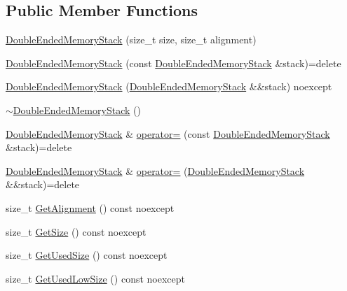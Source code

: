 \subsection*{Public Member Functions}
\begin{DoxyCompactItemize}
\item 
\mbox{\hyperlink{classmage_1_1_double_ended_memory_stack_a6480666c03ac703fc4fd5a62a766438d}{Double\+Ended\+Memory\+Stack}} (size\+\_\+t size, size\+\_\+t alignment)
\item 
\mbox{\hyperlink{classmage_1_1_double_ended_memory_stack_a8a903d4a209929854a6f50cf98e3e2da}{Double\+Ended\+Memory\+Stack}} (const \mbox{\hyperlink{classmage_1_1_double_ended_memory_stack}{Double\+Ended\+Memory\+Stack}} \&stack)=delete
\item 
\mbox{\hyperlink{classmage_1_1_double_ended_memory_stack_a89d83095cc04686b9775fc4a55a5ff30}{Double\+Ended\+Memory\+Stack}} (\mbox{\hyperlink{classmage_1_1_double_ended_memory_stack}{Double\+Ended\+Memory\+Stack}} \&\&stack) noexcept
\item 
\mbox{\hyperlink{classmage_1_1_double_ended_memory_stack_afaac4a28ea1e386bc83d3e07fd5531a0}{$\sim$\+Double\+Ended\+Memory\+Stack}} ()
\item 
\mbox{\hyperlink{classmage_1_1_double_ended_memory_stack}{Double\+Ended\+Memory\+Stack}} \& \mbox{\hyperlink{classmage_1_1_double_ended_memory_stack_aafcc4b3cd8d87d75cc3de53994b6ef7e}{operator=}} (const \mbox{\hyperlink{classmage_1_1_double_ended_memory_stack}{Double\+Ended\+Memory\+Stack}} \&stack)=delete
\item 
\mbox{\hyperlink{classmage_1_1_double_ended_memory_stack}{Double\+Ended\+Memory\+Stack}} \& \mbox{\hyperlink{classmage_1_1_double_ended_memory_stack_a95b220925f1ef732c104901c3f55015d}{operator=}} (\mbox{\hyperlink{classmage_1_1_double_ended_memory_stack}{Double\+Ended\+Memory\+Stack}} \&\&stack)=delete
\item 
size\+\_\+t \mbox{\hyperlink{classmage_1_1_double_ended_memory_stack_a6f2d4036e67cca2836293ad421ddfdfd}{Get\+Alignment}} () const noexcept
\item 
size\+\_\+t \mbox{\hyperlink{classmage_1_1_double_ended_memory_stack_a68d69d69243d5ef8a9fd12b7d7a42993}{Get\+Size}} () const noexcept
\item 
size\+\_\+t \mbox{\hyperlink{classmage_1_1_double_ended_memory_stack_ae9c3c9a0f4e330b20ef63e0a21b91459}{Get\+Used\+Size}} () const noexcept
\item 
size\+\_\+t \mbox{\hyperlink{classmage_1_1_double_ended_memory_stack_af7fd015832d8c6c56619917492e62a2e}{Get\+Used\+Low\+Size}} () const noexcept

\end{DoxyCompactItemize}
